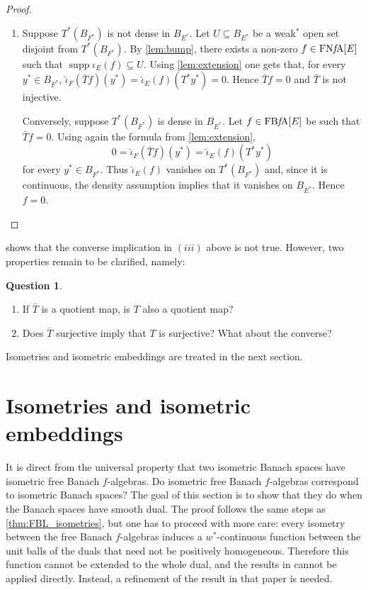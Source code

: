 \documentclass{memo-l}
\theoremstyle{definition}
\newtheorem{question}[theorem]{Question}
\theoremstyle{remark}
\numberwithin{section}{chapter}
\numberwithin{equation}{chapter}
\newcommand{\falg}{$f\!$-algebra}
\newcommand{\FNFA}[1]{\operatorname{FN{\it f}\!A}[#1]}
\newcommand{\FBFA}[1]{\operatorname{FB{\it f}\!A}[#1]}
\DeclareMathOperator{\supp}{supp}
\begin{document}
\begin{proof}
\begin{enumerate}
        \item Suppose
            $T^{*}(B_{F^{*}})$ is not dense in $B_{E^{*}}$. Let
            $U\subseteq B_{E^{*}}$ be a weak$^*$ open set disjoint from
            $T^{*}(B_{F^{*}})$. By \cref{lem:bump}, there exists a non-zero
            $f \in \FNFA E$ such that $\supp \iota _E(f) \subseteq U$.
            Using \cref{lem:extension} one gets that, for every
            $y^{*}\in B_{F^{*}}$, $\hat{\iota
            }_F(\bar{T}f)(y^{*})=\hat{\iota }_E(f)(T^{*}y^{*})=0$.
            Hence $\bar{T}f=0$ and $\bar{T}$ is not injective.

            Conversely, suppose $T^{*}(B_{F^{*}})$ is dense in
            $B_{E^{*}}$. Let $f \in \FBFA E$ be such that
            $\bar{T}f=0$. Using again the formula from
            \cref{lem:extension},
            \[
                0=\hat{\iota }_F(\bar{T}f)(y^{*})=\hat{\iota }_E(f)(T^{*}y^{*})
            \]
            for every $y^{*}\in B_{F^{*}}$. Thus $\hat{\iota
            }_E(f)$ vanishes on
            $T^{*}(B_{F^{*}})$ and, since it is continuous, the
            density assumption implies that it vanishes on
            $B_{E^{*}}$. Hence $f=0$.\qedhere
    \end{enumerate}
\end{proof}

 shows that the converse implication
in $(iii)$ above is not true. However, two properties remain to be
clarified, namely:
\begin{question}
    \begin{enumerate}
        \item If $\bar{T}$ is a quotient map, is $T$ also a quotient
            map?
        \item Does $\bar{T}$ surjective imply that $T$ is surjective?
            What about the converse?
    \end{enumerate}
\end{question}

Isometries and isometric embeddings are treated in the next section.

\section{Isometries and isometric embeddings}
\label{sec:isometries}

It is direct from the universal property that two isometric Banach
spaces have isometric free Banach \falg s. Do isometric free Banach
\falg s correspond to isometric Banach spaces? The goal of this
section is to show that they do when the Banach spaces have smooth
dual. The proof follows the same steps as
\cref{thm:FBL_isometries}, but one has to proceed with more care:
every isometry between the free Banach \falg s induces a
$w^{*}$-continuous function between the unit balls of the duals that
need not be positively homogeneous. Therefore this function cannot
be extended to the whole dual, and the results in
\cite{ilisevic_turnesk2020} cannot be applied directly. Instead, a
refinement of the result in that paper is needed.
\end{document}
